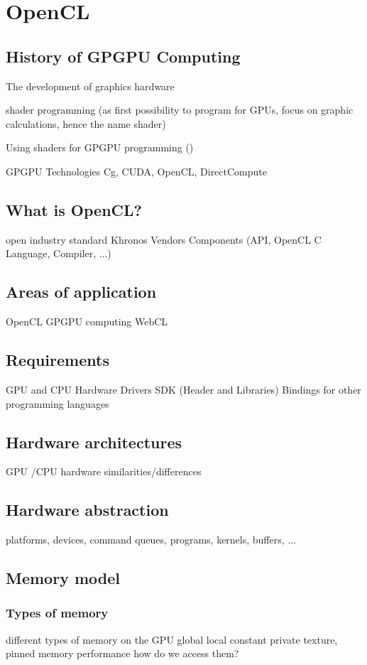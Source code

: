 \section{OpenCL}

\subsection{History of GPGPU Computing}
The development of graphics hardware

shader programming (as first possibility to program for GPUs, focus on graphic calculations, hence the name shader)

Using shaders for GPGPU programming ()

GPGPU Technologies
Cg, CUDA, OpenCL, DirectCompute

\subsection{What is OpenCL?}
open industry standard
Khronos
Vendors
Components (API, OpenCL C Language, Compiler, ...)

\subsection{Areas of application}
OpenCL
GPGPU computing
WebCL

\subsection{Requirements}
GPU and CPU Hardware
Drivers
SDK (Header and Libraries)
Bindings for other programming languages

\subsection{Hardware architectures}

GPU /CPU hardware
similarities/differences

\subsection{Hardware abstraction}
platforms, devices, command queues, programs, kernels, buffers, ...

\subsection{Memory model}

\subsubsection{Types of memory}
different types of memory on the GPU
global local constant private
texture, pinned memory
performance
how do we access them?

